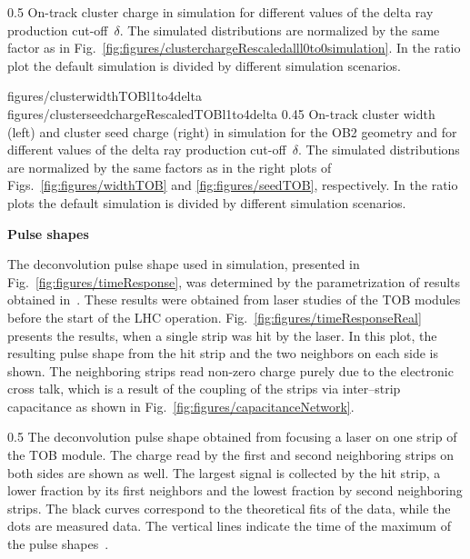                  {0.5}       %
                 {  On-track cluster charge in simulation for different values of the delta ray production cut-off~$\delta$. The simulated distributions are normalized by the same factor as in Fig.~\ref{fig:figures/clusterchargeRescaledalll0to0simulation}. In the ratio plot the default simulation is divided by different simulation scenarios. }

                 {figures/clusterwidthTOBl1to4delta}
                 {figures/clusterseedchargeRescaledTOBl1to4delta} %
                 {0.45}       %
                 {  On-track cluster width (left) and cluster seed charge (right) in simulation for the OB2 geometry and for different values of the delta ray production cut-off~$\delta$.   The simulated distributions are normalized by the same factors as in the right plots of Figs.~\ref{fig:figures/widthTOB} and \ref{fig:figures/seedTOB}, respectively.  In the ratio plots the default simulation is divided by different simulation scenarios. }

\textbf{Pulse shapes}

The deconvolution pulse shape used in simulation, presented in Fig.~\ref{fig:figures/timeResponse}, was determined by the parametrization of results obtained in~\cite{Delaere:1061284}. These results were obtained from laser studies of the TOB modules before the start of the LHC operation. Fig.~\ref{fig:figures/timeResponseReal} presents the results, when a single strip was hit by the laser. In this plot, the resulting pulse shape from the hit strip and the two neighbors on each side is shown. The neighboring strips read non-zero charge purely due to the electronic cross talk, which is a result of the coupling of the strips via inter--strip capacitance as shown in Fig.~\ref{fig:figures/capacitanceNetwork}. 



                 {0.5}       %
                 { The deconvolution pulse shape obtained from focusing a laser on one strip of the TOB module. The charge read by the first and second neighboring strips on both sides are shown as well. The largest signal is collected by the hit strip, a lower fraction by its first neighbors and the lowest fraction by second neighboring strips. The black curves correspond to the theoretical fits of the data, while the dots are measured data. The vertical lines indicate the time of the maximum of the pulse shapes~\cite{Delaere:1061284}.  }


